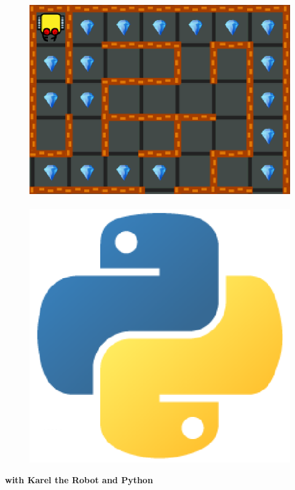 \documentclass[article,A4,12pt]{llncs}
\begin{document}
\begin{figure}[!ht]
\begin{center}
\vspace{-6mm}
\includegraphics[width=0.26\textheight]{imgk/karel-logo.png}\ \ \ \ \ \ 
\includegraphics[width=0.2\textheight]{imgp/python-logo.png}
\vbox{}
\vspace{-9mm}
\end{center}
\end{figure}
\begin{center}
{\huge \bf with Karel the Robot and Python}
\end{center}
\vbox{}
\vspace{1cm}
\end{document}
